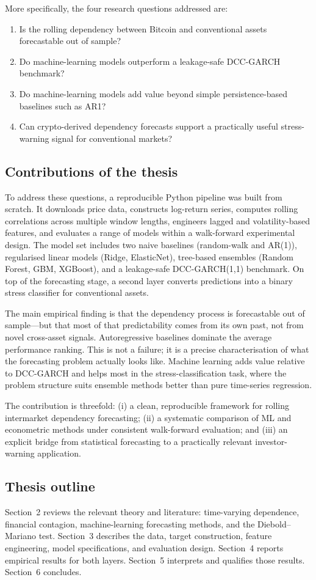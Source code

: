 More specifically, the four research questions addressed are:

\begin{enumerate}
    \item Is the rolling dependency between Bitcoin and conventional assets forecastable out of sample?
    \item Do machine-learning models outperform a leakage-safe DCC-GARCH benchmark?
    \item Do machine-learning models add value beyond simple persistence-based baselines such as AR1?
    \item Can crypto-derived dependency forecasts support a practically useful stress-warning signal for conventional markets?
\end{enumerate}

\subsection{Contributions of the thesis}

To address these questions, a reproducible Python pipeline was built from scratch. It downloads price data, constructs log-return series, computes rolling correlations across multiple window lengths, engineers lagged and volatility-based features, and evaluates a range of models within a walk-forward experimental design. The model set includes two naive baselines (random-walk and AR(1)), regularised linear models (Ridge, ElasticNet), tree-based ensembles (Random Forest, GBM, XGBoost), and a leakage-safe DCC-GARCH(1,1) benchmark. On top of the forecasting stage, a second layer converts predictions into a binary stress classifier for conventional assets.

The main empirical finding is that the dependency process is forecastable out of sample---but that most of that predictability comes from its own past, not from novel cross-asset signals. Autoregressive baselines dominate the average performance ranking. This is not a failure; it is a precise characterisation of what the forecasting problem actually looks like. Machine learning adds value relative to DCC-GARCH and helps most in the stress-classification task, where the problem structure suits ensemble methods better than pure time-series regression.

The contribution is threefold: (i) a clean, reproducible framework for rolling intermarket dependency forecasting; (ii) a systematic comparison of ML and econometric methods under consistent walk-forward evaluation; and (iii) an explicit bridge from statistical forecasting to a practically relevant investor-warning application.

\subsection{Thesis outline}

Section~2 reviews the relevant theory and literature: time-varying dependence, financial contagion, machine-learning forecasting methods, and the Diebold--Mariano test. Section~3 describes the data, target construction, feature engineering, model specifications, and evaluation design. Section~4 reports empirical results for both layers. Section~5 interprets and qualifies those results. Section~6 concludes.
